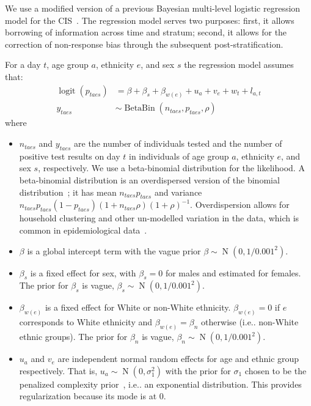 \documentclass[9pt,twocolumn,twoside]{pnas-new}
\makeatletter
\def\dist{\sim}
\DeclareMathOperator{\BB}{BetaBin}
\DeclareMathOperator{\N}{N}
\DeclareMathOperator{\logit}{logit}
\DeclareRobustCommand\onedot{\futurelet\@let@token\@onedot}
\def\@onedot{\ifx\@let@token.\else.\null\fi\xspace}
\def\ie{i.e\onedot} \def\Ie{{I.e}\onedot}
\makeatother
\begin{document}
We use a modified version of a previous Bayesian multi-level logistic regression model for the CIS~\citep{pouwelsMRPvaccination}.
The regression model serves two purposes: first, it allows borrowing of information across time and stratum; second, it allows for the correction of non-response bias through the subsequent post-stratification.

For a day $t$, age group $a$, ethnicity $e$, and sex $s$ the regression model assumes that:
\begin{align}
    \logit(p_{taes}) &= \beta + \beta_s + \beta_{w(e)} + u_a + v_e + w_t + l_{a,t} \\
    y_{taes} &\dist \BB(n_{taes}, p_{taes}, \rho)
\end{align}
where
\begin{itemize}
    \item $n_{taes}$ and $y_{taes}$ are the number of individuals tested and the number of positive test results on day $t$ in individuals of age group $a$, ethnicity $e$, and sex $s$, respectively. We use a beta-binomial distribution for the likelihood.
    A beta-binomial distribution is an overdispersed version of the binomial distribution~\citep{hughesUsing}; it has mean $n_{taes} p_{taes}$ and variance $n_{taes} p_{taes} (1 - p_{taes}) (1 + n_{taes} \rho) (1 + \rho)^{-1}$. 
    Overdispersion allows for household clustering and other un-modelled variation in the data, which is common in epidemiological data~\citep{griffithsBBD}.
    \item $\beta$ is a global intercept term with the vague prior $\beta \dist \N(0, 1/0.001^2)$.
    \item $\beta_s$ is a fixed effect for sex, with $\beta_s = 0$ for males and estimated for females. The prior for $\beta_s$ is vague, $\beta_s \dist \N(0, 1/0.001^2)$.
    \item $\beta_{w(e)}$ is a fixed effect for White or non-White ethnicity. $\beta_{w(e)} = 0$ if $e$ corresponds to White ethnicity and $\beta_{w(e)} = \beta_{n}$ otherwise (\ie non-White ethnic groups).
      The prior for $\beta_n$ is vague, $\beta_n \dist \N(0, 1/0.001^2)$.
    \item $u_a$ and $v_e$ are independent normal random effects for age and ethnic group respectively.
    That is, $u_a \dist \N(0, \sigma_1^2)$ with the prior for $\sigma_1$ chosen to be the penalized complexity prior~\citep{simpsonPenalising}, \ie an exponential distribution.
    This provides regularization because its mode is at 0.

\end{itemize}
\end{document}

